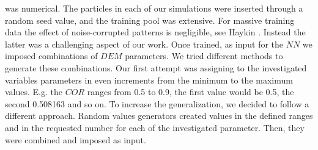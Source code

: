 was numerical.
The particles in each of our simulations were inserted through a random
seed value, and the training pool was extensive.
For massive training data the effect of noise-corrupted patterns is negligible, see Haykin \cite{RefWorks:158}. 
Instead the latter was a challenging aspect of our work. Once trained, as input for the $NN$ we imposed 
combinations of $DEM$ parameters. 
We tried different methods to generate these combinations. 
Our first attempt was assigning to the investigated variables parameters in even increments 
from the minimum to the maximum values. 
E.g. the $COR$ ranges from 0.5 to 0.9, the first value would be 0.5, the second 0.508163 and so on. 
To increase the generalization, we decided to follow a different approach. 
Random values generators created values in the defined ranges and in the requested 
number for each of the investigated parameter. Then, they were combined and imposed as input.\\

